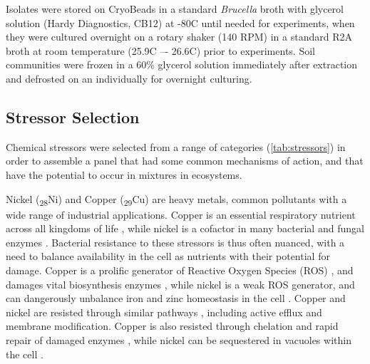 \documentclass[final,1p,times]{elsarticle}
\begin{document}
Isolates were stored on CryoBeads in a standard \textit{Brucella} broth with glycerol solution (Hardy Diagnostics, CB12) at -80\textdegree C until needed for experiments, when they were cultured overnight on a rotary shaker (140 RPM) in a standard R2A broth at room temperature (25.9\textdegree C –- 26.6\textdegree C) prior to experiments. Soil communities were frozen in a 60\% glycerol solution immediately after extraction and defrosted on an individually for overnight culturing. 

\subsection{Stressor Selection}
\label{S:2:2}

Chemical stressors were selected from a range of categories (\cref{tab:stressors}) in order to assemble a panel that had some common mechanisms of action, and that have the potential to occur in mixtures in ecosystems.

Nickel (\textsubscript{28}Ni) and Copper (\textsubscript{29}Cu) are heavy metals, common pollutants with a wide range of industrial applications. Copper is an essential respiratory nutrient across all kingdoms of life \cite{Babcock1992}, while nickel is a cofactor in many bacterial and fungal enzymes \cite{Zamble2015}. Bacterial resistance to these stressors is thus often nuanced, with a need to balance availability in the cell as nutrients with their potential for damage.  Copper is a prolific generator of Reactive Oxygen Species (ROS) \cite{Bal2002}, and damages vital biosynthesis enzymes \cite{Macomber2009}, while nickel is a weak ROS generator, and can dangerously unbalance iron and zinc homeostasis in the cell \cite{Samland2006}. Copper and nickel are resisted through similar pathways \cite{Mykytczuk2011CytoplasmicFerrooxidans}, including active efflux and membrane modification. Copper is also resisted through chelation and rapid repair of damaged enzymes \cite{Macomber2009}, while nickel can be sequestered in vacuoles within the cell \cite{Nishimura1998}.
\end{document}
